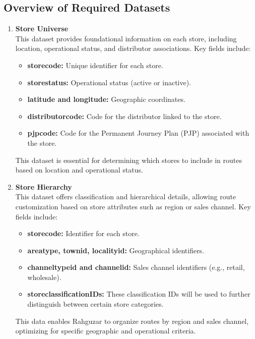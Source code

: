 \subsection*{Overview of Required Datasets}

\begin{enumerate}

\item \textbf{Store Universe} \\
This dataset provides foundational information on each store, including location, operational status, and distributor associations. Key fields include:
    \begin{itemize}
        \item \textbf{storecode:} Unique identifier for each store.
        \item \textbf{storestatus:} Operational status (active or inactive).
        \item \textbf{latitude and longitude:} Geographic coordinates.
        \item \textbf{distributorcode:} Code for the distributor linked to the store.
        \item \textbf{pjpcode:} Code for the Permanent Journey Plan (PJP) associated with the store.
    \end{itemize}
This dataset is essential for determining which stores to include in routes based on location and operational status.

\item \textbf{Store Hierarchy} \\
This dataset offers classification and hierarchical details, allowing route customization based on store attributes such as region or sales channel. Key fields include:
    \begin{itemize}
        \item \textbf{storecode:} Identifier for each store.
        \item \textbf{areatype, townid, localityid:} Geographical identifiers.
        \item \textbf{channeltypeid and channelid:} Sales channel identifiers (e.g., retail, wholesale).
        \item \textbf{storeclassificationIDs: } These classification IDs will be used to further distinguish between certain store categories.
    \end{itemize}
This data enables Rahguzar to organize routes by region and sales channel, optimizing for specific geographic and operational criteria.


\end{enumerate}
